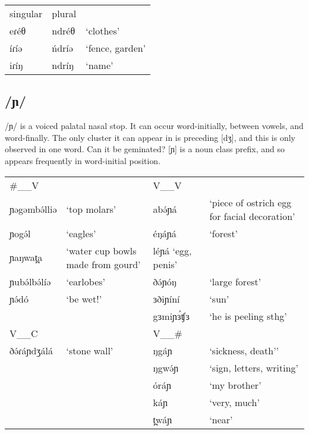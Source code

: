 \ea	 
\begin{tabular}[t]{lll}
		singular	&plural\\
		eɾéθ		&ndréθ		&‘clothes’\\
		íɾíə		&ńdríə		&‘fence, garden’\\
		iɾíŋ		&ndríŋ		&‘name’
\end{tabular}\label{ex:ch2:33}
\z

\subsection{/ɲ/}
/ɲ/ is a voiced palatal nasal stop. It can occur word-initially, between vowels, and word-finally. The only cluster it can appear in is preceding [dʒ], and this is only observed in one word. Can it be geminated? [ɲ] is a noun class prefix, and so appears frequently in word-initial position.
\ea
\begin{tabular}[t]{lp{3cm}lp{3cm}}
\#\_\_V	&&	V\_\_V		\\
ɲəgəmbə́lliə	&‘top molars’		&abə́ɲá	&‘piece of ostrich egg for facial decoration’\\
ɲogə́l		&‘eagles’			&éŋáɲá	&‘forest’\\
ɲaŋwat̪a		&‘water cup bowls made from gourd’		&léɲá	‘egg, penis’\\
ɲubə́lbə́líə	&‘earlobes’		&ðə́ɲóŋ		&‘large forest’\\
ɲə́dó			&‘be wet!’		&ɜðiɲíní	&‘sun’\\
							&&gɜmiɲɜ́ʧɜ	&‘he is peeling sthg’\\
\midrule
V\_\_C		&&	V\_\_\# 	\\
\midrule
ðə́ɾáɲdʒálá	&‘stone wall’		&ŋgáɲ	&‘sickness, death’’\\
						&&ŋgwə́ɲ	&‘sign, letters, writing’\\
						&&óráɲ	&‘my brother’ \\
						&&káɲ	&‘very, much’\\
						&&t̪wáɲ	&‘near’
\end{tabular}\label{ex:ch2:34}
\z

